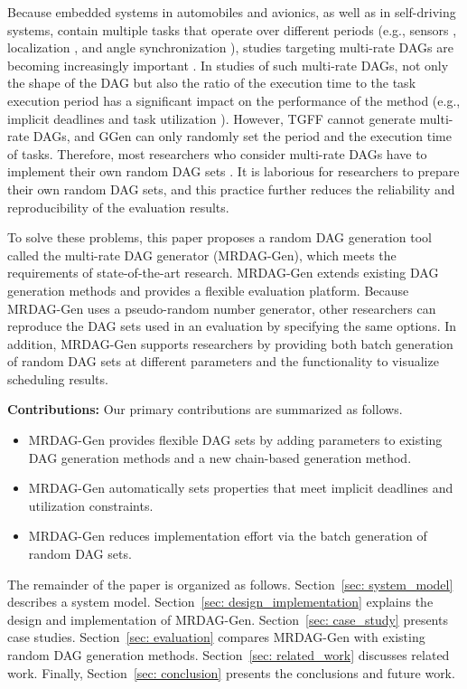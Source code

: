 Because embedded systems in automobiles and avionics, as well as in self-driving systems, contain multiple tasks that operate over different periods (e.g., sensors \cite{guanindustry}, localization \cite{verucchi2020latency}, and angle synchronization \cite{hamann2017communication}), studies targeting multi-rate DAGs are becoming increasingly important \cite{gunzel2021suspension, kordon2020evaluation}.
In studies of such multi-rate DAGs, not only the shape of the DAG but also the ratio of the execution time to the task execution period has a significant impact on the performance of the method (e.g., implicit deadlines \cite{ueter2021hard, cho2021conditionally} and task utilization \cite{nogd2020response, yang2020mixed}).
However, TGFF cannot generate multi-rate DAGs, and GGen can only randomly set the period and the execution time of tasks.
Therefore, most researchers who consider multi-rate DAGs have to implement their own random DAG sets \cite{voronov2021ai, dong2019efficient, yang2020mixed, nogd2020response}.
It is laborious for researchers to prepare their own random DAG sets, and this practice further reduces the reliability and reproducibility of the evaluation results.

To solve these problems, this paper proposes a random DAG generation tool called the multi-rate DAG generator (MRDAG-Gen), which meets the requirements of state-of-the-art research.
MRDAG-Gen extends existing DAG generation methods and provides a flexible evaluation platform.
Because MRDAG-Gen uses a pseudo-random number generator, other researchers can reproduce the DAG sets used in an evaluation by specifying the same options.
In addition, MRDAG-Gen supports researchers by providing both batch generation of random DAG sets at different parameters and the functionality to visualize scheduling results.

\textbf{Contributions: } Our primary contributions are summarized as follows.
\begin{itemize}
    \item MRDAG-Gen provides flexible DAG sets by adding parameters to existing DAG generation methods and a new chain-based generation method.
    \item MRDAG-Gen automatically sets properties that meet implicit deadlines and utilization constraints.
    \item MRDAG-Gen reduces implementation effort via the batch generation of random DAG sets.
\end{itemize}

The remainder of the paper is organized as follows.
Section~\ref{sec: system_model} describes a system model.
Section~\ref{sec: design_implementation} explains the design and implementation of MRDAG-Gen.
Section~\ref{sec: case_study} presents case studies.
Section~\ref{sec: evaluation} compares MRDAG-Gen with existing random DAG generation methods.
Section~\ref{sec: related_work} discusses related work.
Finally, Section~\ref{sec: conclusion} presents the conclusions and future work.
